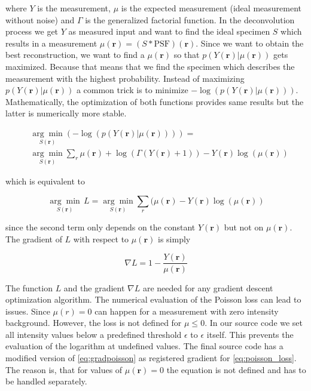 \documentclass{juliacon}
\begin{document}
where $Y$ is the measurement, $\mu$ is the expected measurement (ideal measurement without noise) and $\Gamma$ is the generalized factorial function.
In the deconvolution process we get $Y$ as measured input and want to find the ideal specimen $S$ which results in a measurement $\mu(\mathbf r) = (S * \text{PSF})(\mathbf r)$.
Since we want to obtain the best reconstruction, we want 
to find a $\mu(\mathbf r)$ so that $p(Y(\mathbf r) | \mu(\mathbf r))$ gets maximized.
Because that means
that we find the specimen which describes the measurement with the highest probability.
Instead of maximizing $p(Y(\mathbf r) | \mu(\mathbf r))$ a common trick is to minimize $- \log(p(Y(\mathbf r)|\mu(\mathbf r)))$. 
Mathematically, the optimization of both functions provides same results but the latter is numerically more stable.

\begin{align}
&\underset{S(\mathbf r)}{\arg \min} (- \log(p(Y(\mathbf r)|\mu(\mathbf r)))) =\\ &\underset{S(\mathbf r)}{\arg \min} \sum_r \mu(\mathbf r) + \log(\Gamma(Y(\mathbf r) + 1)) - Y(\mathbf r) \log(\mu(\mathbf r))
\end{align}

which is equivalent to

\begin{equation}
    \underset{S(\mathbf r)}{\arg \min}\, L = \underset{S(\mathbf r)}{\arg \min} \sum_r (\mu(\mathbf r)  - Y(\mathbf r) \log(\mu(\mathbf r))
    \label{eq:poisson_loss}
\end{equation}

since the second term only depends on the constant $Y(\mathbf r)$ but not on $\mu(\mathbf r)$.
The gradient of $L$ with respect to $\mu(\mathbf r)$ is simply

\begin{equation}
    \nabla L = 1 - \frac{Y(\mathbf r)}{\mu(\mathbf r)}
    \label{eq:gradpoisson}
\end{equation}

The function $L$ and the gradient $\nabla L$ are needed for any gradient descent optimization algorithm.
The numerical evaluation of the Poisson loss can lead to issues. Since $\mu(r)=0$ can happen for a measurement with zero intensity background. However, the loss is not defined for $\mu \leq 0$. In our source code we set all intensity values below a predefined threshold $\epsilon$ to $\epsilon$ itself. This prevents the evaluation of the logarithm at undefined values.
The final source code has a modified version of \autoref{eq:gradpoisson} as registered gradient for \autoref{eq:poisson_loss}.
The reason is, that for values of $\mu(\mathbf r) = 0$ the equation is not defined and has to be handled separately. 
\end{document}
